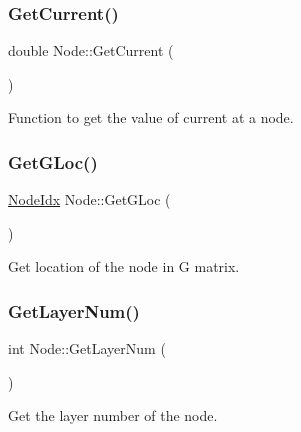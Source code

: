 \mbox{\label{classNode_aa91dbf36b0f693850cf422bebb7632ee}} 
\subsubsection{\texorpdfstring{Get\+Current()}{GetCurrent()}}
{\footnotesize\ttfamily double Node\+::\+Get\+Current (\begin{DoxyParamCaption}{ }\end{DoxyParamCaption})}



Function to get the value of current at a node. 

\mbox{\label{classNode_ad65d1c171a8fd20ef1a55ed040f11b75}} 
\subsubsection{\texorpdfstring{Get\+G\+Loc()}{GetGLoc()}}
{\footnotesize\ttfamily \hyperlink{node_8h_a5b622fe4354316a2f349615d150ae998}{Node\+Idx} Node\+::\+Get\+G\+Loc (\begin{DoxyParamCaption}{ }\end{DoxyParamCaption})}



Get location of the node in G matrix. 

\mbox{\label{classNode_a5937a2591132f22361ce12edfe6af39f}} 
\subsubsection{\texorpdfstring{Get\+Layer\+Num()}{GetLayerNum()}}
{\footnotesize\ttfamily int Node\+::\+Get\+Layer\+Num (\begin{DoxyParamCaption}{ }\end{DoxyParamCaption})}



Get the layer number of the node. 

\mbox{\label{classNode_a02cc6f413616e5a1314ef708505ccdce}} 
